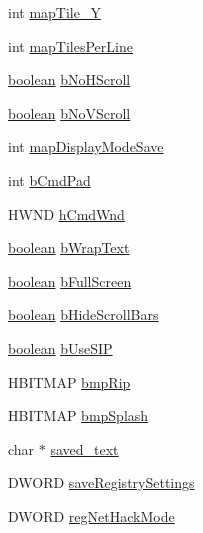 \begin{DoxyCompactItemize}
int \hyperlink{structmswin__nhwindow__app_a699b7a92f8c907030eff6ef5a36d29f3}{map\+Tile\+\_\+\+Y}
\item 
int \hyperlink{structmswin__nhwindow__app_a7a89a59512a3bb56005832843339f479}{map\+Tiles\+Per\+Line}
\item 
\hyperlink{global_8h_a531b10dd351aa162d7dcccd1966308b8}{boolean} \hyperlink{structmswin__nhwindow__app_a75259e1f797e53006ad99a4a28fe9b36}{b\+No\+H\+Scroll}
\item 
\hyperlink{global_8h_a531b10dd351aa162d7dcccd1966308b8}{boolean} \hyperlink{structmswin__nhwindow__app_ad0311b73326a15c00e147d1b9d809979}{b\+No\+V\+Scroll}
\item 
int \hyperlink{structmswin__nhwindow__app_a3b5b16eaa9f892c5911bf6e37b888ea6}{map\+Display\+Mode\+Save}
\item 
int \hyperlink{structmswin__nhwindow__app_ad92d2a6da1489504549e4cd7d8237d8e}{b\+Cmd\+Pad}
\item 
H\+W\+N\+D \hyperlink{structmswin__nhwindow__app_add8def82fb90c4305efcbc002d0f61e2}{h\+Cmd\+Wnd}
\item 
\hyperlink{global_8h_a531b10dd351aa162d7dcccd1966308b8}{boolean} \hyperlink{structmswin__nhwindow__app_a602ad0b692afb2be5e62dbec41942b17}{b\+Wrap\+Text}
\item 
\hyperlink{global_8h_a531b10dd351aa162d7dcccd1966308b8}{boolean} \hyperlink{structmswin__nhwindow__app_a03ec520343918e83b3b20c9c08ee9d57}{b\+Full\+Screen}
\item 
\hyperlink{global_8h_a531b10dd351aa162d7dcccd1966308b8}{boolean} \hyperlink{structmswin__nhwindow__app_a9bf5a4ea1b1d3680e30d893f16117a8f}{b\+Hide\+Scroll\+Bars}
\item 
\hyperlink{global_8h_a531b10dd351aa162d7dcccd1966308b8}{boolean} \hyperlink{structmswin__nhwindow__app_af8a7fc1fc5568f109bb31fd054a38470}{b\+Use\+S\+I\+P}
\item 
H\+B\+I\+T\+M\+A\+P \hyperlink{structmswin__nhwindow__app_a999ca1b8a326d75bf29ede7b2cbeb205}{bmp\+Rip}
\item 
H\+B\+I\+T\+M\+A\+P \hyperlink{structmswin__nhwindow__app_ae46760e977e06676139a68adec0d2648}{bmp\+Splash}
\item 
char $\ast$ \hyperlink{structmswin__nhwindow__app_ace0e848571fb0210599f108fe2bbc009}{saved\+\_\+text}
\item 
D\+W\+O\+R\+D \hyperlink{structmswin__nhwindow__app_a3a571f4429ee942b1f03c5facfd21d20}{save\+Registry\+Settings}
\item 
D\+W\+O\+R\+D \hyperlink{structmswin__nhwindow__app_aded0a94e58119ccbb1b375ccd3de7d2e}{reg\+Net\+Hack\+Mode}

\end{DoxyCompactItemize}
